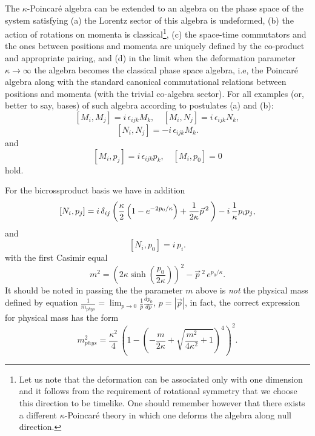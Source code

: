 \documentclass[a4paper,a4paper]{article}
\begin{document}
The $\kappa$-Poincar\'e algebra can be extended to an algebra on the phase space of the system satisfying (a) the Lorentz sector of this algebra is undeformed, (b) the action of rotations  on momenta is classical\footnote{Let us note that the deformation can be associated only with one dimension and it follows from the requirement of rotational symmetry that we choose this direction to be timelike. One should remember however that there exists a different $\kappa$-Poincar\'e theory in which one deforms the algebra along null direction.}, (c) the space-time commutators and the ones between positions and momenta are uniquely defined by the co-product and appropriate pairing, and (d) in the limit when the deformation parameter $\kappa \rightarrow\infty$ the algebra becomes the classical phase space algebra, i.e, the Poincar\'e algebra along with the standard canonical commutational relations between positions and momenta (with the trivial co-algebra sector). For all examples (or, better to say, bases) of such algebra  according to postulates (a) and (b):
$$
[M_i, M_j] = i\, \epsilon_{ijk} M_k, \quad [M_i, N_j] = i\, \epsilon_{ijk} N_k,
$$
\begin{equation}\label{1}
  [N_i, N_j] = -i\, \epsilon_{ijk} M_k.
\end{equation}
and
\begin{equation}\label{2}
  [M_i, p_j] = i\, \epsilon_{ijk} p_k, \quad [M_i, p_0] =0
\end{equation}
hold.
\newline

For the bicrossproduct basis we have in addition 
\begin{equation}\label{3}
   \left[N_{i}, p_{j}\right] = i\,  \delta_{ij}
 \left( {\kappa\over 2} \left(
 1 -e^{-2{p_{0}/ \kappa}}
\right) + {1\over 2\kappa} \vec{p}\,{}^{ 2}\, \right) - i\,
{1\over \kappa} p_{i}p_{j} ,
\end{equation}
and
\begin{equation}\label{4}
  \left[N_{i},p_{0}\right] = i\, p_{i}.
\end{equation}
with the first Casimir equal
\begin{equation}\label{5}
 m^2 = \left(2\kappa \sinh \left(\frac{p_0}{2\kappa}\right)\right)^2 - \vec{p}\,{}^2\, e^{p_0/\kappa}.
\end{equation}
It should be noted in passing the the parameter $m$ above is {\em not} the physical mass defined by equation $\frac{1}{m_{phys}}=\lim_{p\rightarrow0}\frac{1}{p}\frac{dp_0}{dp}$, $p =|\vec{p}|$, in fact, the correct expression for physical mass has the form
$$
{m^2_{phys}}=\frac{\kappa^2}{4}\, \left(1-\left(-\frac{m}{2\kappa} +
\sqrt{\frac{m^2}{4\kappa^2} +1}\right)^4\right)^2.
$$
\end{document}
